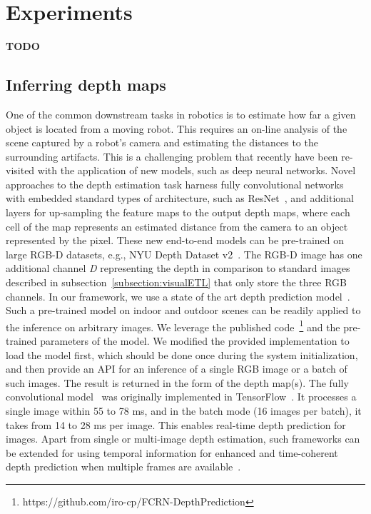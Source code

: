 \section{Experiments}
\textbf{TODO}

\subsection{Inferring depth maps}
One of the common downstream tasks in robotics is to estimate how far a given object is located from a moving robot. This requires an on-line analysis of the scene captured by a robot's camera and estimating the distances to the surrounding artifacts. This is a challenging problem that recently have been re-visited with the application of new models, such as deep neural networks. Novel approaches to the depth estimation task harness fully convolutional networks with embedded standard types of architecture, such as ResNet~\cite{resnet1, resnet2}, and additional layers for up-sampling the feature maps to the output depth maps, where each cell of the map represents an estimated distance from the camera to an object represented by the pixel. These new end-to-end models can be pre-trained on large RGB-D datasets, e.g., NYU Depth Dataset v2~\cite{nyuDepthDataset}. The RGB-D image has one additional channel \textit{D} representing the depth in comparison to standard images described in subsection~\ref{subsection:visualETL} that only store the three RGB channels. In our framework, we use a state of the art depth prediction model~\cite{depthPredictModel}. Such a pre-trained model on indoor and outdoor scenes can be readily applied to the inference on arbitrary images. We leverage the published code~\footnote{https://github.com/iro-cp/FCRN-DepthPrediction} and the pre-trained parameters of the model. We modified the provided implementation to load the model first, which should be done once during the system initialization, and then provide an API for an inference of a single RGB image or a batch of such images. The result is returned in the form of the depth map(s). The fully convolutional model~\cite{depthPredictModel} was originally implemented in TensorFlow~\cite{TensorFlow}. It  processes a single image within 55 to 78 ms, and in the batch mode (16 images per batch), it takes from 14 to 28 ms per image. This enables real-time depth prediction for images. Apart from single or multi-image depth estimation, such frameworks can be extended for using temporal information for enhanced and time-coherent depth prediction when multiple frames are available~\cite{videoDepthExtraction}.